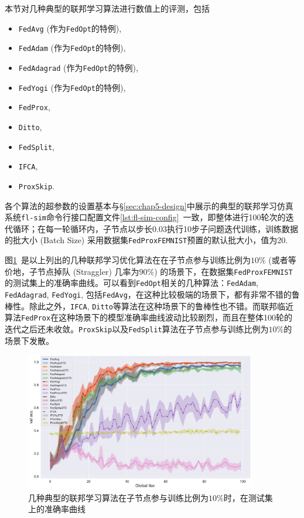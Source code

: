 本节对几种典型的联邦学习算法进行数值上的评测，包括
\begin{itemize}
    \item \texttt{FedAvg}\cite{mcmahan2017fed_avg} (作为\texttt{FedOpt}\cite{reddi2020fed_opt}的特例),
    \item \texttt{FedAdam}\cite{reddi2020fed_opt, adam} (作为\texttt{FedOpt}\cite{reddi2020fed_opt}的特例),
    \item \texttt{FedAdagrad}\cite{reddi2020fed_opt, adagrad} (作为\texttt{FedOpt}\cite{reddi2020fed_opt}的特例),
    \item \texttt{FedYogi}\cite{reddi2020fed_opt, Zaheer_2018_yogi} (作为\texttt{FedOpt}\cite{reddi2020fed_opt}的特例),
    \item \texttt{FedProx}\cite{sahu2018fedprox},
    \item \texttt{Ditto}\cite{li_2021_ditto},
    \item \texttt{FedSplit}\cite{pathak2020fedsplit},
    \item \texttt{IFCA}\cite{Ghosh_2022_cfl},
    \item \texttt{ProxSkip}\cite{proxskip}.
\end{itemize}
各个算法的超参数的设置基本与\S\ref{sec:chap5-design}中展示的典型的联邦学习仿真系统\texttt{fl-sim}命令行接口配置文件\ref{lst:fl-sim-config}~一致，即整体进行100轮次的迭代循环；在每一轮循环内，子节点以步长0.03执行10步子问题迭代训练，训练数据的批大小 (Batch Size) 采用数据集\texttt{FedProxFEMNIST}预置的默认批大小，值为20.

图\ref{fig:standard-test-ratio-10-val-acc}~是以上列出的几种联邦学习优化算法在在子节点参与训练比例为$10\%$ (或者等价地，子节点掉队 (Straggler) 几率为$90\%$) 的场景下，在数据集\texttt{FedProxFEMNIST}的测试集上的准确率曲线。可以看到\texttt{FedOpt}相关的几种算法：\texttt{FedAdam}, \texttt{FedAdagrad}, \texttt{FedYogi}, 包括\texttt{FedAvg}，在这种比较极端的场景下，都有非常不错的鲁棒性。除此之外，\texttt{IFCA}, \texttt{Ditto}等算法在这种场景下的鲁棒性也不错。而联邦临近算法\texttt{FedProx}在这种场景下的模型准确率曲线波动比较剧烈，而且在整体100轮的迭代之后还未收敛。\texttt{ProxSkip}以及\texttt{FedSplit}算法在子节点参与训练比例为$10\%$的场景下发散。

\begin{figure}[H]
    \centering
    \includegraphics[width=0.9\textwidth]{figures/standard-test-ratio-10-val-acc.pdf}
    \caption{几种典型的联邦学习算法在子节点参与训练比例为$10\%$时，在测试集上的准确率曲线}
    \label{fig:standard-test-ratio-10-val-acc}
\end{figure}

